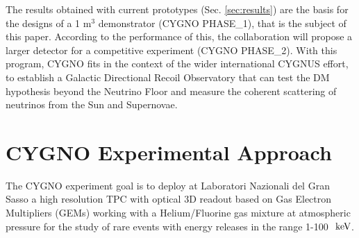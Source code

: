 \documentclass[physics,article,submit,moreauthors,pdftex]{Definitions/mdpi}
\newcommand{\keV}{\ensuremath{\,\textrm{ke\hspace{-.08em}V}}\xspace}
\begin{document}
The results obtained with current prototypes (Sec. \ref{sec:results}) 
are the basis for the designs of a 1 m$^3$ demonstrator (CYGNO PHASE\_1), that is the subject of this paper. 
According to the performance of this, the collaboration will propose a larger detector for a competitive experiment (CYGNO PHASE\_2).
With this program, CYGNO fits in the context of the wider international CYGNUS effort, to establish a Galactic Directional Recoil Observatory that can test the DM hypothesis beyond the Neutrino Floor and measure the coherent scattering of neutrinos from the Sun and Supernovae\cite{Vahsen:2020pzb}.




\section{CYGNO Experimental Approach}\label{sec:project}

The CYGNO experiment goal is to deploy at Laboratori Nazionali del Gran Sasso a high resolution TPC with optical 3D readout based on Gas Electron Multipliers (GEMs) working with a Helium/Fluorine gas mixture at atmospheric pressure for the study of rare events with energy releases in the range 1-100~\keV.
\end{document}
